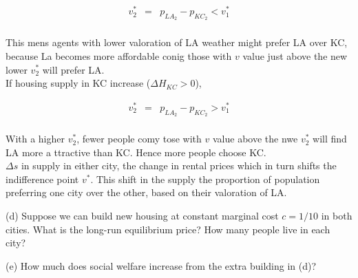 \begin{eqnarray*}
    v^*_2 &=& p_{LA_2} - p_{KC_2} < v^*_1\\
\end{eqnarray*}

This mens agents with lower valoration of LA weather might prefer LA over KC, because La becomes more affordable conig those with $v$ value just above the new lower $v^*_2$ will prefer LA.\\

If housing supply in KC increase ($\Delta H_{KC} > 0$), 

\begin{eqnarray*}
    v^*_2 &=& p_{LA_2} - p_{KC_2} > v^*_1\\
\end{eqnarray*}

With a higher $v^*_2$, fewer people comy tose with $v$ value above the nwe $v^*_2$ will find LA more a ttractive than KC. Hence more people choose KC.\\

$\Delta s$ in supply in either city, the change in rental prices which in turn shifts the indifference point $v^*$. This shift in the supply the proportion of population preferring one city over the other, based on their valoration of LA.
\begin{tcolorbox}
    (d) Suppose we can build new housing at constant marginal cost \( c = 1/10 \) in both cities. What is the long-run equilibrium price? How many people live in each city?
\end{tcolorbox}
\begin{tcolorbox}
    (e) How much does social welfare increase from the extra building in (d)?
\end{tcolorbox}
